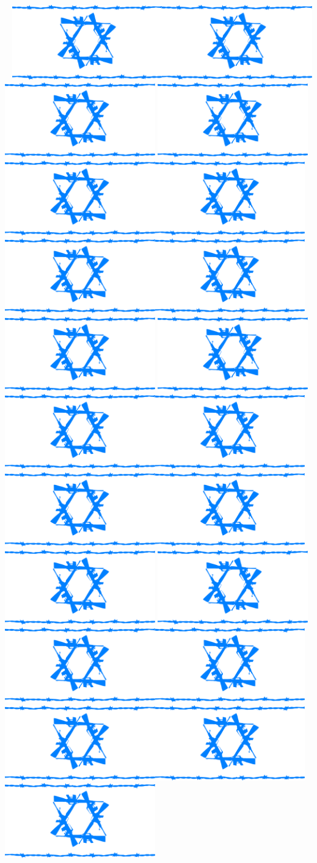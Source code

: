 \documentclass{article}
\newcommand{\flag}{\includegraphics[width=6.5cm]{flago.eps}}
\newcommand{\flagrow}{\vfill\flag\hfill\flag\hfill\flag\vfill}
\begin{document}
\begin{center}
	~
	\flagrow
	\flagrow
	\flagrow
	\flagrow
	\flagrow
	\flagrow
	\flagrow
\end{center}
\end{document}
